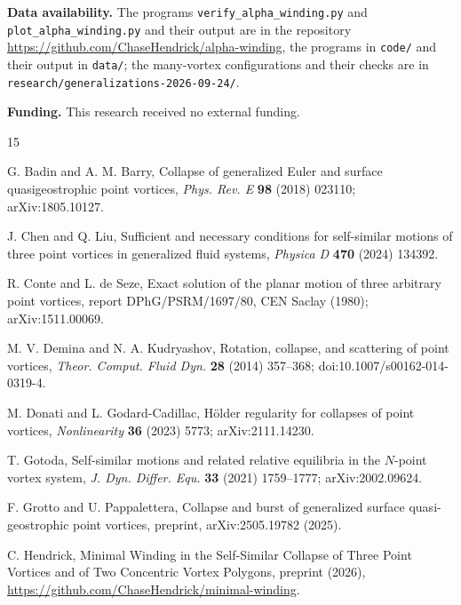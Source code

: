 \documentclass[11pt]{article}
\theoremstyle{definition}
\begin{document}
\medskip
{\sloppy\noindent\textbf{Data availability.} The programs \texttt{verify\_alpha\_winding.py} and \texttt{plot\_alpha\_winding.py} and their output are in the repository \url{https://github.com/ChaseHendrick/alpha-winding}, the programs in \texttt{code/} and their output in \texttt{data/}; the many-vortex configurations and their checks are in \texttt{research/generalizations-2026-09-24/}.\par}

\noindent\textbf{Funding.} This research received no external funding.

\smallskip
{}

\begin{thebibliography}{15}

 G. Badin and A. M. Barry, Collapse of generalized Euler and surface quasigeostrophic point vortices, \emph{Phys. Rev. E} \textbf{98} (2018) 023110; arXiv:1805.10127.

 J. Chen and Q. Liu, Sufficient and necessary conditions for self-similar motions of three point vortices in generalized fluid systems, \emph{Physica D} \textbf{470} (2024) 134392.

 R. Conte and L. de Seze, Exact solution of the planar motion of three arbitrary point vortices, report DPhG/PSRM/1697/80, CEN Saclay (1980); arXiv:1511.00069.

 M. V. Demina and N. A. Kudryashov, Rotation, collapse, and scattering of point vortices, \emph{Theor. Comput. Fluid Dyn.} \textbf{28} (2014) 357--368; doi:10.1007/s00162-014-0319-4.

 M. Donati and L. Godard-Cadillac, H\"older regularity for collapses of point vortices, \emph{Nonlinearity} \textbf{36} (2023) 5773; arXiv:2111.14230.

 T. Gotoda, Self-similar motions and related relative equilibria in the $N$-point vortex system, \emph{J. Dyn. Differ. Equ.} \textbf{33} (2021) 1759--1777; arXiv:2002.09624.

 F. Grotto and U. Pappalettera, Collapse and burst of generalized surface quasi-geostrophic point vortices, preprint, arXiv:2505.19782 (2025).

 C. Hendrick, Minimal Winding in the Self-Similar Collapse of Three Point Vortices and of Two Concentric Vortex Polygons, preprint (2026), \url{https://github.com/ChaseHendrick/minimal-winding}.


\end{thebibliography}
\end{document}
